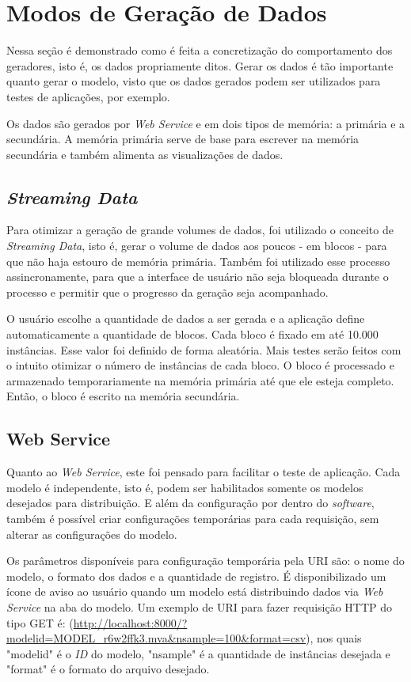 \documentclass[
	12pt,				%
	openright,			%
	oneside,			%
	a4paper,			%
	english,			%
	brazil				%
	]{abntex2}
\begin{document}
	\section{Modos de Geração de Dados}
		Nessa seção é demonstrado como é feita a concretização do comportamento dos geradores, isto é, os dados propriamente ditos.
		Gerar os dados é tão importante quanto gerar o modelo, visto que os dados gerados podem ser utilizados para testes de aplicações, por exemplo.
		\par
		Os dados são gerados por \emph{Web Service} e em dois tipos de memória: a primária e a secundária.
		A memória primária serve de base para escrever na memória secundária e também alimenta as visualizações de dados.
		\subsection{\emph{Streaming Data}}
			Para otimizar a geração de grande volumes de dados, foi utilizado o conceito de \emph{Streaming Data}, isto é, gerar o volume de dados aos poucos - em blocos - para que não haja estouro de memória primária.
			Também foi utilizado esse processo assincronamente, para que a interface de usuário não seja bloqueada durante o processo e permitir que o progresso da geração seja acompanhado.
			\par
			O usuário escolhe a quantidade de dados a ser gerada e a aplicação define automaticamente a quantidade de blocos.
			Cada bloco é fixado em até 10.000 instâncias.
			Esse valor foi definido de forma aleatória.
			Mais testes serão feitos com o intuito otimizar o número de instâncias de cada bloco.
			O bloco é processado e armazenado temporariamente na memória primária até que ele esteja completo.
			Então, o bloco é escrito na memória secundária.
		\subsection{Web Service}
			Quanto ao \emph{Web Service}, este foi pensado para facilitar o teste de aplicação.
			Cada modelo é independente, isto é, podem ser habilitados somente os modelos desejados para distribuição.
			E além da configuração por dentro do \emph{software}, também é possível criar configurações temporárias para cada requisição, sem alterar as configurações do modelo.
			\par
			Os parâmetros disponíveis para configuração temporária pela URI são: o nome do modelo, o formato dos dados e a quantidade de registro.
			É disponibilizado um ícone de aviso ao usuário quando um modelo está distribuindo dados via \emph{Web Service} na aba do modelo.
			Um exemplo de URI para fazer requisição HTTP do tipo GET é: (\url{http://localhost:8000/?modelid=MODEL_r6w2ffk3.mva&nsample=100&format=csv}), nos quais "modelid" é o \emph{ID} do modelo, "nsample" é a quantidade de instâncias desejada e "format" é o formato do arquivo desejado.
	 
\end{document}
